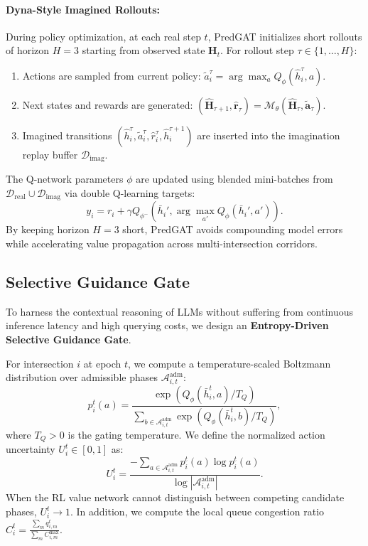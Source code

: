 \documentclass[11pt,a4paper,twocolumn]{article}
\begin{document}
\paragraph{Dyna-Style Imagined Rollouts:}
During policy optimization, at each real step $t$, PredGAT initializes short rollouts of horizon $H=3$ starting from observed state $\mathbf{H}_t$. For rollout step $\tau \in \{1, \dots, H\}$:
\begin{enumerate}
    \item Actions are sampled from current policy: $\widetilde{a}_i^\tau = \arg\max_{a} Q_\phi(\widehat{h}_i^\tau, a)$.
    \item Next states and rewards are generated: $(\widehat{\mathbf{H}}_{\tau+1}, \widehat{\mathbf{r}}_\tau) = \mathcal{M}_\theta(\widehat{\mathbf{H}}_\tau, \widetilde{\mathbf{a}}_\tau)$.
    \item Imagined transitions $(\widehat{h}_i^\tau, \widetilde{a}_i^\tau, \widehat{r}_i^\tau, \widehat{h}_i^{\tau+1})$ are inserted into the imagination replay buffer $\mathcal{D}_{\text{imag}}$.
\end{enumerate}
The Q-network parameters $\phi$ are updated using blended mini-batches from $\mathcal{D}_{\text{real}} \cup \mathcal{D}_{\text{imag}}$ via double Q-learning targets:
\begin{equation}
    y_i = r_i + \gamma Q_{\phi^-}\left( \bar{h}_i', \arg\max_{a'} Q_\phi(\bar{h}_i', a') \right).
\end{equation}
By keeping horizon $H=3$ short, PredGAT avoids compounding model errors while accelerating value propagation across multi-intersection corridors.

\subsection{Selective Guidance Gate}
\label{subsec:gate}
To harness the contextual reasoning of LLMs without suffering from continuous inference latency and high querying costs, we design an \textbf{Entropy-Driven Selective Guidance Gate}.

For intersection $i$ at epoch $t$, we compute a temperature-scaled Boltzmann distribution over admissible phases $\mathcal{A}_{i,t}^{\text{adm}}$:
\begin{equation}
    p_i^t(a) = \frac{\exp(Q_\phi(\bar{h}_i^t, a) / T_Q)}{\sum_{b \in \mathcal{A}_{i,t}^{\text{adm}}} \exp(Q_\phi(\bar{h}_i^t, b) / T_Q)},
\end{equation}
where $T_Q > 0$ is the gating temperature. We define the normalized action uncertainty $U_i^t \in [0, 1]$ as:
\begin{equation}
    U_i^t = \frac{-\sum_{a \in \mathcal{A}_{i,t}^{\text{adm}}} p_i^t(a) \log p_i^t(a)}{\log |\mathcal{A}_{i,t}^{\text{adm}}|}.
\end{equation}
When the RL value network cannot distinguish between competing candidate phases, $U_i^t \to 1$. In addition, we compute the local queue congestion ratio $C_i^t = \frac{\sum_{m} q_{i,m}^t}{\sum_{m} C_{i,m}^{\max}}$.
\end{document}
